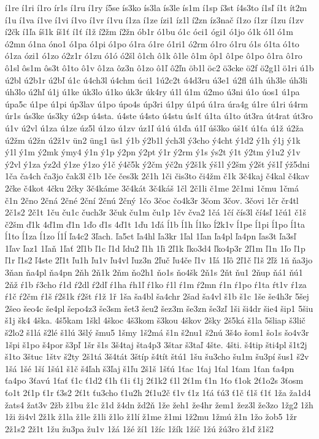 {í1re
í1ri
í1ro
ír1s
í1ru
í1ry
í5se
ís3ko
ís3la
ís3le
ís1m
í1sp
í3st
í4s3to
í1sľ
í1t
ít2m
í1u
í1va
í1ve
í1vi
í1vo
í1vr
í1vu
í1za
í1ze
ízi1
íz1l
í2zn
íz3nač
í1zo
í1zr
í1zu
í1zv
í2čk
í1ľa
íš1k
íš1ť
í1ť
í1ž
í2žm
í2žn
ób1r
ó1bu
ó1c
óci1
ógi1
ó1jo
ó1k
ó1l
ó1m
ó2mn
ó1na
óno1
ó1pa
ó1pi
ó1po
ó1ra
ó1re
ó1ri1
ó2rm
ó1ro
ó1ru
ó1s
ó1ta
ó1to
ó1za
ózi1
ó1zo
ó2z1r
ó1zu
ó1ó
ó2šl
ô1ch
ô1k
ô1le
ô1m
ôp1
ô1pe
ô1po
ô1ra
ô1ro
ô1sl
ôs1m
ôs3t
ô1to
ô1v
ô1za
ôz3n
ô1zo
ô1ľ
ô2ľn
öb1l
öc2
ö3cke
ö2f
ö2g1l
ö1ri
ú1b
ú2bl
ú2b1r
ú2bľ
ú1c
ú4ch3l
ú4chm
úci1
1ú2c2t
ú4d3ru
ú3e1
ú2fl
ú1h
úh3le
úh3li
úh3lo
ú2hľ
ú1j
ú1ke
úk3lo
ú1ko
úk3r
úk4ry
ú1l
ú1m
ú2mo
ú3ni
ú1o
úos1
ú1pa
úpa5c
ú1pe
ú1pi
úp3lav
ú1po
úpo4s
úp3ri
ú1py
ú1pú
ú1ra
úra4g
ú1re
ú1ri
ú4rm
úr1s
ús3ke
ús3ky
ú2sp
ú4sta.
ú4ste
ú4sto
ú4stu
ús1ť
ú1ta
ú1to
út3ra
út4rat
út3ro
ú1v
ú2vl
ú1za
ú1ze
úz5l
ú1zo
ú1zv
úz1ľ
ú1ú
ú1ďa
ú1ľ
úš3ko
úš1ť
ú1ťa
ú1ž
ú2ža
ú2žm
ú2žn
ú2ž1v
ün2
üng1
üs1
ý1b
ý2b1l
ých3l
ý3cho
ý4cht
ý1d2
ý1h
ý1j
ý1k
ý1l
ý1m
ý2mk
ýmy4
ý1n
ý1p
ý2pn
ý2pt
ý1r
ý2rm
ý1s
ýs2t
ý1t
ý2tm
ý1u2
ý1v
ý2vl
ý1za
ýz2d
ý1ze
ý1zo
ý1č
ý4č5k
ý2čm
ýč2n
ý2š1k
ýš1l
ý2šm
ý2št
ýš1ľ
ýž5dni
1ča
ča4ch
ča3jo
čak3l
č1b
1če
čes3k
2č1h
1či
čis3to
či4žm
č1k
3č4kaj
č4kal
č4kav
2čke
č4kot
4čku
2čky
3č4káme
3č4kát
3č4káš
1čl
2č1li
č1me
2č1mi
1čmu
1čmá
č1n
2čno
2čná
2čné
2ční
2čnú
2čný
1čo
3čoc
čo4k3r
3čom
3čov.
3čovi
1čr
čr4tl
2č1s2
2č1t
1ču
ču1c
čuch3r
3čuk
ču1m
ču1p
1čv
čva2
1čá
1čí
čís3l
čí4sľ
1čú1
č1š
č2šm
ď1k
4ď1m
ď1n
1ďo
ď1s
4ď1t
1ďu
1ďá
ĺ1b
ĺ1h
ĺ1ko
ĺ2k1v
ĺ1pe
ĺ1pi
ĺ1po
ĺ1ta
ĺ1to
ĺ1za
ĺ1zo
ĺ1ĺ
ľa4c2
3ľach.
ľa5ct
ľa4hl
ľa3kr
1ľal
1ľan
ľa4pl
ľa4pn
ľas3t
ľa3sľ
1ľav
ľaz1
1ľaň
1ľať
2ľ1b
ľ1c
ľ1d
ľdu2
ľ1h
1ľi
2ľ1k
ľko3d4
ľko4p3r
2ľ1m
ľ1n
1ľo
ľ1p
ľ1r
ľ1s2
ľ4ste
2ľ1t
ľu1h
ľu1v
ľu4vl
ľuz3n
2ľuč
ľu4če
ľ1v
1ľá
1ľô
2ľ1č
ľ1š
2ľž
1ň
ňa3jo
3ňan
ňa4pl
ňa4pn
2ňh
2ň1k
2ňm
ňo2h1
ňo1s
ňo4šk
2ň1s
2ňt
ňu1
2ňup
ňá1
ňú1
2ňž
ŕ1b
ŕ3cho
ŕ1d
ŕ2dl
ŕ2dľ
ŕ1ha
ŕh1ľ
ŕ1ko
ŕ1l
ŕ1m
ŕ2mn
ŕ1n
ŕ1po
ŕ1ta
ŕt1v
ŕ1za
ŕ1č
ŕ2čm
ŕ1š
ŕ2š1k
ŕ2št
ŕ1ž
1ř
1ša
ša4bl
ša4chr
2šad
ša4vl
š1b
š1c
1še
še4h3r
5šej
2šeo
šeo4c
še4pl
šepo4z3
še3sm
šet3
šeu2
šez3m
še3zn
še3zľ
1ši
ši4dr
šie4
šip1
5šiu
š1j
šk4
4ška.
4š5kam
1škl
4škoc
4š3kom
š3kou
4škov
2šky
2š5ká
š1la
5šliap
š3lič
š2lo2
š1lá
š2lé
š1lú
3šlý
šmu5
1šmy
1š2má
š1n
š2nu1
š2nú
3š4o
šom1
šo1s
šo4v3r
1špi
š1po
š4por
š3pľ
1šr
š1s
3š4taj
šta4p3
3štar
š3taľ
4šte.
4šti.
š4tip
šti4pl
š1t2j
š1to
3štuc
1štv
š2ty
2š1tá
3š4tát
3štíp
š4tít
štú1
1šu
šu3cho
šu1m
šu3pí
šus1
š2v
1šá
1šé
1ší
1šú1
š1č
š4ľah
š3ľaj
š1ľu
2š1š
1šťú
1ťac
1ťaj
1ťal
1ťam
1ťan
ťa4pn
ťa4po
3ťavú
1ťať
ť1c
ť1d2
ť1h
ť1i
ť1j
2ť1k2
ť1l
2ť1m
ť1n
1ťo
ť1ok
2ť1o2s
3ťosm
ťo1t
2ť1p
ť1r
ť3s2
2ť1t
ťu3cho
ť1u2h
2ť1u2č
ť1v
ť1z
1ťá
ťú3
ť1č
ť1š
ť1ť
1ža
ža1d4
žats4
žat3v
2žb
ž1bu
ž1c
ž1d
ž4dn
žd2ň
1že
žeh1
že4hr
žem1
žez3l
že3zo
1žg2
1žh
1ži
ži4vl
2ž1k
ž1la
ž1le
ž1li
ž1lo
ž1lí
ž1me
ž1mi
1ž2mu
1žmú
ž1n
1žo
žob5
1žr
2ž1s2
2ž1t
1žu
žu3pa
žu1v
1žá
1žé
ží1
1žíc
1žík
1žíč
1žú
žú3ro
ž1ď
ž1š2
}
